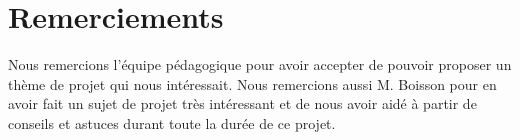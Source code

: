 \documentclass[a4paper, 11pt]{article}
\begin{document}
\section{Remerciements}
Nous remercions l'équipe pédagogique pour avoir accepter de pouvoir proposer un thème de projet qui nous intéressait. Nous remercions aussi M. Boisson pour en avoir fait un sujet de projet très intéressant et de nous avoir aidé à partir de conseils et astuces durant toute la durée de ce projet.

\newpage


\end{document}
